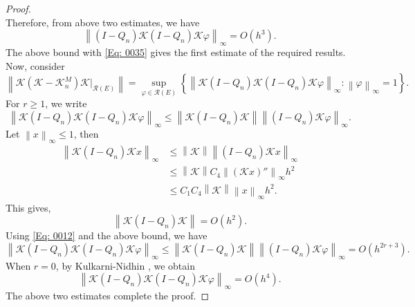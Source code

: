 \documentclass[pdflatex, sn-mathphys-num]{sn-jnl}%
\newcommand{\norm}[1]{\left\lVert #1\right\rVert}
\theoremstyle{thmstyleone}%
\theoremstyle{thmstyletwo}%
\theoremstyle{thmstylethree}%
\begin{document}
\begin{proof}
\begin{equation*}
	\end{equation*}
	Therefore, from above two estimates, we have
	\begin{equation*} 
		\norm{(I - Q_n) \mathcal{K}(I - Q_n)\mathcal{K}\varphi}_\infty = O\left(h^{3}\right).
	\end{equation*}
	The above bound with \eqref{Eq: 0035} gives the first estimate of the required results. Now, consider
	\begin{equation*}
		\norm{\mathcal{K}(\mathcal{K} - \mathcal{K}_n^M) \mathcal{K} |_{\mathcal{R}(E)}} 
		= \sup_{\varphi \in \mathcal{R}(E)}\left\{  \norm{\mathcal{K}(I - Q_n) \mathcal{K}(I - Q_n)\mathcal{K}\varphi}_\infty : \norm{\varphi}_\infty =1 \right\}.
	\end{equation*}
	For \(r \geq 1\), we write
	\begin{equation*}
		\norm{\mathcal{K}(I - Q_n) \mathcal{K}(I - Q_n)\mathcal{K}\varphi}_\infty \leq \norm{\mathcal{K}(I - Q_n)\mathcal{K}} \norm{(I - Q_n)\mathcal{K}\varphi}_\infty.
	\end{equation*}
	Let $\norm{x}_\infty \leq 1$, then
	\begin{align*}
		\norm{\mathcal{K}(I - Q_n)\mathcal{K}x}_\infty &\leq \norm{\mathcal{K}} \norm{(I - Q_n)\mathcal{K}x}_\infty \\
		&\leq \norm{\mathcal{K}} C_4 \norm{(\mathcal{K}x)''}_{\infty} h^2 \\
		&\leq C_1 C_4 \norm{\mathcal{K}} \norm{x}_{\infty} h^2.
	\end{align*}
	This gives,
	\begin{equation*}
		\norm{\mathcal{K}(I - Q_n)\mathcal{K}} = O\left(h^2\right).
	\end{equation*} 
	Using \eqref{Eq: 0012} and the above bound, we have
	\begin{equation*} 
		\norm{\mathcal{K}(I - Q_n) \mathcal{K}(I - Q_n)\mathcal{K}\varphi}_\infty \leq \norm{\mathcal{K}(I - Q_n)\mathcal{K}} 	\norm{(I - Q_n)\mathcal{K}\varphi}_\infty = 	O\left(h^{2r+3}\right).
	\end{equation*}
	When \(r=0\), by Kulkarni-Nidhin \cite[Proposition 3.7]{RPKTJN}, we obtain
	\begin{equation*} 
		\norm{\mathcal{K}(I - Q_n) \mathcal{K}(I - Q_n)\mathcal{K}\varphi}_\infty = 	O\left(h^{4}\right).
	\end{equation*}
	The above two estimates complete the proof.
\end{proof}
\end{document}
